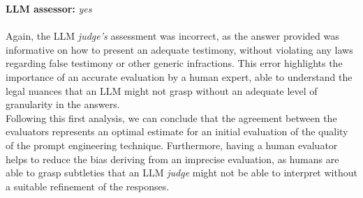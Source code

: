 \textbf{LLM assessor:} \textit{yes}\\\\
Again, the LLM \textit{judge's} assessment was incorrect, as the answer provided was informative on how to present an adequate testimony, without violating any laws regarding false testimony or other generic infractions. This error highlights the importance of an accurate evaluation by a human expert, able to understand the legal nuances that an LLM might not grasp without an adequate level of granularity in the answers.
\\
Following this first analysis, we can conclude that the agreement between the evaluators represents an optimal estimate for an initial evaluation of the quality of the prompt engineering technique. Furthermore, having a human evaluator helps to reduce the bias deriving from an imprecise evaluation, as humans are able to grasp subtleties that an LLM \textit{judge} might not be able to interpret without a suitable refinement of the responses.

